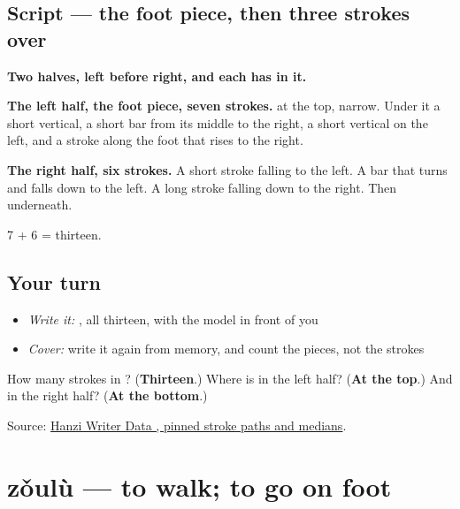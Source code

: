 \subsection*{Script — the foot piece, then three strokes over }

\begin{quote}
\end{quote}

\textbf{Two halves, left before right, and each has  in it.}

\textbf{The left half, the foot piece, seven strokes.}  at the top, narrow. Under it a short vertical, a short bar from its middle to the right, a short vertical on the left, and a stroke along the foot that rises to the right.

\textbf{The right half, six strokes.} A short stroke falling to the left. A bar that turns and falls down to the left. A long stroke falling down to the right. Then  underneath.

7 + 6 = thirteen.

\subsection*{Your turn}
\begin{itemize}
\raggedright
  \item \emph{Write it:} , all thirteen, with the model in front of you
  \item \emph{Cover:} write it again from memory, and count the pieces, not the strokes
\end{itemize}

\begin{tcolorbox}[breakable,colback=teal!4,colframe=teal!35!black,title={Before you move on}]
How many strokes in ? (\textbf{Thirteen}.) Where is  in the left half? (\textbf{At the top}.) And in the right half? (\textbf{At the bottom}.)

Source: \href{https://raw.githubusercontent.com/chanind/hanzi-writer-data/68d10a4b21150cae5e1ebbd223eed289cf32d90c/data/\%E8\%B7\%AF.json}{Hanzi Writer Data , pinned stroke paths and medians}.
\end{tcolorbox}
\section[zǒulù]{zǒulù — to walk; to go on foot}

